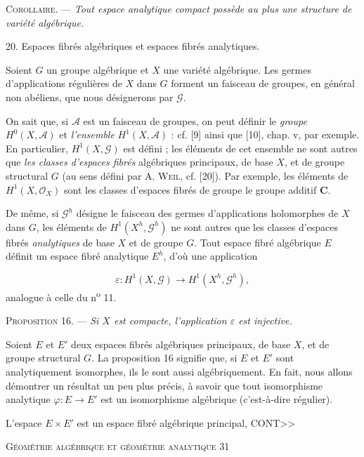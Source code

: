 \textsc{Corollaire}. --- \textit{Tout espace analytique compact possède au plus une structure de variété algébrique.}


20. Espaces fibrés algébriques et espaces fibrés analytiques.

Soient $G$ un groupe algébrique et $X$ une variété algébrique. Les germes d'applications régulières de $X$ dans $G$ forment un faisceau de groupes, en général non abéliens, que nous désignerons par $\mathcal{G}$.

On sait que, si $\mathcal{A}$ est un faisceau de groupes, on peut définir le \textit{groupe} $H^0(X, \mathcal{A})$ et \textit{l'ensemble} $H^1(X, \mathcal{A})$ : cf. [9] ainsi que [10], chap. v, par exemple. En particulier, $H^1(X, \mathcal{G})$ est défini ; les éléments de cet ensemble ne sont autres que \textit{les classes d'espaces fibrés} algébriques principaux, de base $X$, et de groupe structural $G$ (au sens défini par A. \textsc{Weil}, cf. [20]). Par exemple, les éléments de $H^1(X, \mathcal{O}_X)$ sont les classes d'espaces fibrés de groupe le groupe additif $\mathbf{C}$.

De même, si $\mathcal{G}^h$ désigne le faisceau des germes d'applications holomorphes de $X$ dans $G$, les éléments de $H^1(X^h, \mathcal{G}^h)$ ne sont autres que les classes d'espaces fibrés \textit{analytiques} de base $X$ et de groupe $G$. Tout espace fibré algébrique $E$ définit un espace fibré analytique $E^h$, d'où une application

\begin{equation*}
\varepsilon : H^1(X, \mathcal{G}) \to H^1(X^h, \mathcal{G}^h),
\end{equation*}
analogue à celle du n\textsuperscript{o} 11.

\textsc{Proposition} 16. --- \textit{Si $X$ est compacte, l'application $\varepsilon$ est injective.}

Soient $E$ et $E'$ deux espaces fibrés algébriques principaux, de base $X$, et de groupe structural $G$. La proposition 16 signifie que, si $E$ et $E'$ sont analytiquement isomorphes, ils le sont aussi algébriquement. En fait, nous allons démontrer un résultat un peu plus précis, à savoir que tout isomorphisme analytique $\varphi : E \to E'$ est un isomorphisme algébrique (c'est-à-dire régulier).

L'espace $E \times E'$ est un espace fibré algébrique principal, CONT>>




\textsc{Géométrie algébrique et géométrie analytique} \hfill 31

